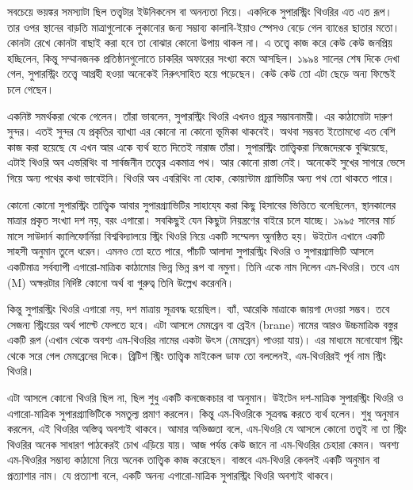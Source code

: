 \documentclass[
  letterpaper,
  DIV=11,
  numbers=noendperiod]{scrreprt}
\begin{document}
সবচেয়ে ভয়ঙ্কর সমস্যাটা ছিল তত্ত্বটার ইউনিকনেস বা অনন্যতা নিয়ে। একদিকে
সুপারস্ট্রিং থিওরির এত এত রূপ। তার ওপর স্থানের বাড়তি মাত্রাগুলোকে লুকানোর জন্য
সম্ভাব্য কালাবি-ইয়াও স্পেসও বেড়ে গেল ব্যাঙের ছাতার মতো। কোনটা রেখে কোনটা
বাছাই করা হবে তা বোঝার কোনো উপায় থাকল না। এ তত্ত্বে কাজ করে কেউ কেউ জনপ্রিয়
হচ্ছিলেন, কিন্তু সম্মানজনক প্রতিষ্ঠানগুলোতে চাকরির অফারের সংখ্যা কমে আসছিল। ১৯৯৪
সালের শেষ দিকে দেখা গেল, সুপারস্ট্রিং তত্ত্বে আগ্রহী হওয়া অনেকেই নিরুৎসাহিত হয়ে
পড়েছেন। কেউ কেউ তো এটা ছেড়ে অন্য ফিল্ডেই চলে গেছেন।

একনিষ্ট সমর্থকরা থেকে গেলেন। তাঁরা ভাবলেন, সুপারস্ট্রিং থিওরি এখনও প্রচুর
সম্ভাবনাময়ী। এর কাঠামোটা দারুণ সুন্দর। এতই সুন্দর যে প্রকৃতির ব্যাখ্যা এর কোনো না
কোনো ভূমিকা থাকবেই। অথবা সম্ভবত ইতোমধ্যে এত বেশি কাজ করা হয়েছে যে এখন আর
একে ব্যর্থ হতে দিতেই নারাজ তাঁরা। সুপারস্ট্রিং তাত্ত্বিকরা নিজেদেরকে বুঝিয়েছে,
এটাই থিওরি অব এভরিথিং বা সার্বজনীন তত্ত্বের একমাত্র পথ। আর কোনো রাস্তা নেই।
অনেকেই সুখের সাগরে ভেসে গিয়ে অন্য পথের কথা ভাবেইনি। থিওরি অব এবরিথিং না
হোক, কোয়ান্টাম গ্র্যাভিটির অন্য পথ তো থাকতে পারে।

কোনো কোনো সুপারস্ট্রিং তাত্ত্বিক আবার সুপারগ্র্যাভিটির সাহাযে্য করা কিছু
হিসাবের ভিত্তিতে বলেছিলেন, স্থানকালের মাত্রার প্রকৃত সংখ্যা দশ নয়, বরং এগারো।
সবকিছুই যেন কিছুটা নিয়ন্ত্রণের বাইরে চলে যাচ্ছে। ১৯৯৫ সালের মার্চ মাসে সাউদার্ন
ক্যালিফোর্নিয়া বিশ্ববিদ্যালয়ে স্ট্রিং থিওরি নিয়ে একটি সম্মেলন অুনষ্ঠিত হয়। উইটেন
এখানে একটি সাহসী অনুমান তুলে ধরেন। এমনও তো হতে পারে, পাঁচটি আলাদা
সুপারস্ট্রিং থিওরি ও সুপারগ্র্যাভিটি আসলে একটিমাত্র সর্বব্যাপী এগারো-মাত্রিক
কাঠামোর ভিন্ন ভিন্ন রূপ বা নমুনা। তিনি একে নাম দিলেন এম-থিওরি। তবে এম (M)
অক্ষরটার নির্দিষ্ট কোনো অর্থ বা গুরুত্ব তিনি উল্লেখ করেননি।

কিন্তু সুপারস্ট্রিং থিওরি এগারো নয়, দশ মাত্রায় সূত্রবদ্ধ হয়েছিল। ব্যাঁ, আরেকি
মাত্রাকে জায়গা দেওয়া সম্ভব। তবে সেজন্য স্ট্রিংয়ের অর্থ পাল্টে ফেলতে হবে। এটা
আসলে মেমব্রেন বা ব্রেইন (brane) নামের আরও উচ্চমাত্রিক বস্তুর একটি রূপ (এখান
থেকে অবশ্য এম-থিওরির নামের একটা উৎস (মেমব্রেন) পাওয়া যায়)। এর মাধ্যমে
মনোযোগ স্ট্রিং থেকে সরে গেল মেমব্রেনের দিকে। ব্রিটিশ স্ট্রিং তাত্ত্বিক মাইকেল
ডাফ তো বললেনই, এম-থিওরিরই পূর্ব নাম স্ট্রিং থিওরি।

এটা আসলে কোনো থিওরি ছিল না, ছিল শুধু একটি কনজেকচার বা অনুমান। উইটেন
দশ-মাত্রিক সুপারস্ট্রিং থিওরি ও এগারো-মাত্রিক সুপারগ্র্যাভিটিকে সমতুল্য প্রমাণ
করলেন। কিন্তু এম-থিওরিকে সূত্রবদ্ধ করতে ব্যর্থ হলেন। শুধু অনুমান করলেন, এই থিওরির
অস্তিত্ব অবশ্যই থাকবে। আমার অভিজ্ঞতা বলে, এম-থিওরি যে আসলে কোনো তত্ত্বই না
তা স্ট্রিং থিওরির অনেক সাধারণ পাঠকেরই চোখ এড়িয়ে যায়। আজ পর্যন্ত কেউ জানে না
এম-থিওরির চেহারা কেমন। অবশ্য এম-থিওরির সম্ভাব্য কাঠামো নিয়ে অনেক তাত্ত্বিক
কাজ করেছেন। বাস্তবে এম-থিওরি কেবলই একটি অনুমান বা প্রত্যাশার নাম। যে প্রত্যাশা
বলে, একটি অনন্য এগারো-মাত্রিক সুপারস্ট্রিং থিওরি অবশ্যই থাকবে।
\end{document}
